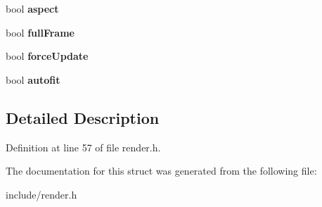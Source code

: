 \begin{DoxyCompactItemize}
\item 
\hypertarget{structRender__t_a99607d2cd5b64eb4d57049aa55f84424}{bool {\bfseries aspect}}\label{structRender__t_a99607d2cd5b64eb4d57049aa55f84424}

\item 
\hypertarget{structRender__t_af06a3a37584a24e9a95379755d8a30b9}{bool {\bfseries full\-Frame}}\label{structRender__t_af06a3a37584a24e9a95379755d8a30b9}

\item 
\hypertarget{structRender__t_ac75e0229bc44b396f7149a1543f0da64}{bool {\bfseries force\-Update}}\label{structRender__t_ac75e0229bc44b396f7149a1543f0da64}

\item 
\hypertarget{structRender__t_a2f43bddf2516241377aead39566d0f5f}{bool {\bfseries autofit}}\label{structRender__t_a2f43bddf2516241377aead39566d0f5f}

\end{DoxyCompactItemize}


\subsection{Detailed Description}


Definition at line 57 of file render.\-h.



The documentation for this struct was generated from the following file\-:\begin{DoxyCompactItemize}
\item 
include/render.\-h\end{DoxyCompactItemize}
